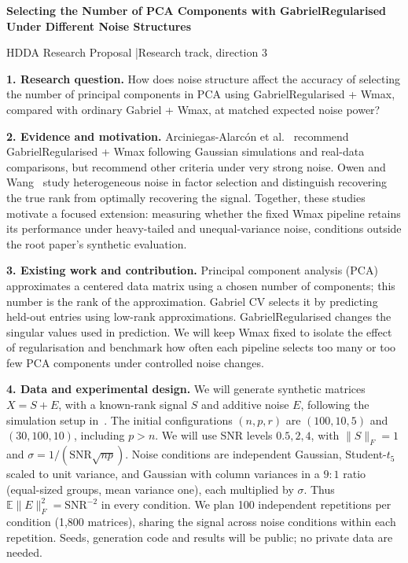 \documentclass[10pt,a4paper]{article}
\newcommand{\topic}[1]{\par\textbf{#1}\enspace}
\begin{document}
\begin{center}
{\large\bfseries Selecting the Number of PCA Components with GabrielRegularised\\[2pt]
Under Different Noise Structures}\par
\vspace{3pt}
{\small HDDA Research Proposal \enspace|\enspace Research track, direction 3}
\end{center}
\vspace{-5pt}

\topic{1. Research question.}
How does noise structure affect the accuracy of selecting the number of principal components in PCA using GabrielRegularised + Wmax, compared with ordinary Gabriel + Wmax, at matched expected noise power?

\topic{2. Evidence and motivation.}
Arciniegas-Alarc\'on et al.~\cite{arciniegas2024} recommend GabrielRegularised + Wmax following Gaussian simulations and real-data comparisons, but recommend other criteria under very strong noise. Owen and Wang~\cite{owen2016} study heterogeneous noise in factor selection and distinguish recovering the true rank from optimally recovering the signal. Together, these studies motivate a focused extension: measuring whether the fixed Wmax pipeline retains its performance under heavy-tailed and unequal-variance noise, conditions outside the root paper's synthetic evaluation.

\topic{3. Existing work and contribution.}
Principal component analysis (PCA) approximates a centered data matrix using a chosen number of components; this number is the rank of the approximation. Gabriel CV selects it by predicting held-out entries using low-rank approximations. GabrielRegularised changes the singular values used in prediction. We will keep Wmax fixed to isolate the effect of regularisation and benchmark how often each pipeline selects too many or too few PCA components under controlled noise changes.

\topic{4. Data and experimental design.}
We will generate synthetic matrices $X=S+E$, with a known-rank signal $S$ and additive noise $E$, following the simulation setup in~\cite{arciniegas2024}.
The initial configurations $(n,p,r)$ are $(100,10,5)$ and $(30,100,10)$, including $p>n$.
We will use SNR levels $0.5,2,4$, with $\|S\|_F=1$ and $\sigma=1/(\mathrm{SNR}\sqrt{np})$.
Noise conditions are independent Gaussian, Student-$t_5$ scaled to unit variance, and Gaussian with column variances in a $9{:}1$ ratio (equal-sized groups, mean variance one), each multiplied by $\sigma$.
Thus $\mathbb{E}\|E\|_F^2=\mathrm{SNR}^{-2}$ in every condition.
We plan 100 independent repetitions per condition (1,800 matrices), sharing the signal across noise conditions within each repetition. Seeds, generation code and results will be public; no private data are needed.
\end{document}
